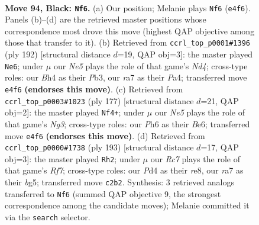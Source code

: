 \documentclass[11pt]{article}
\begin{document}
\clearpage

\begin{figure}[p]\centering
\begin{subfigure}{0.46\textwidth}\centering
\resizebox{\linewidth}{!}{%
\newchessgame
\chessboard[
  setfen={8/R7/7p/4pk2/1K1pn2b/8/2r5/8 b - - 7 94},
  showmover=false,
  pgfstyle=straightmove, color=movearrow, markmove={e4-f6}
]}
\caption{}
\end{subfigure}\hfill
\begin{subfigure}{0.46\textwidth}\centering
\resizebox{\linewidth}{!}{%
\newchessgame
\chessboard[
  setfen={2r5/8/8/p2K4/P2N4/1P6/5k2/8 w - - 1 97},
  showmover=false,
  pgfstyle=straightmove, color=movearrow, markmove={d4-e6}
]}
\caption{}
\end{subfigure}
\\[4pt]
\begin{subfigure}{0.46\textwidth}\centering
\resizebox{\linewidth}{!}{%
\newchessgame
\chessboard[
  setfen={8/R7/4b1n1/6k1/7p/8/6K1/8 b - - 29 89},
  showmover=false,
  pgfstyle=straightmove, color=movearrow, markmove={g6-f4}
]}
\caption{}
\end{subfigure}\hfill
\begin{subfigure}{0.46\textwidth}\centering
\resizebox{\linewidth}{!}{%
\newchessgame
\chessboard[
  setfen={4R3/8/2n5/2k3BP/3p4/8/5r2/3K4 b - - 0 97},
  showmover=false,
  pgfstyle=straightmove, color=movearrow, markmove={f2-h2}
]}
\caption{}
\end{subfigure}
\caption{\textbf{Move 94, Black: \texttt{Nf6}.} (a) Our position; Melanie plays \texttt{Nf6} (\texttt{e4f6}). Panels (b)--(d) are the retrieved master positions whose correspondence most drove this move (highest QAP objective among those that transfer to it). (b) Retrieved from \texttt{ccrl\_top\_p0001\#1396} (ply 192) [structural distance $d$=19, QAP obj=3]: the master played \texttt{Ne6}; under $\mu$ our \emph{Ne5} plays the role of that game's \emph{Nd4}; cross-type roles: our \emph{B}h4 as their \emph{P}b3, our \emph{r}a7 as their \emph{P}a4; transferred move \texttt{e4f6} \textbf{(endorses this move)}. (c) Retrieved from \texttt{ccrl\_top\_p0003\#1023} (ply 177) [structural distance $d$=21, QAP obj=2]: the master played \texttt{Nf4+}; under $\mu$ our \emph{Ne5} plays the role of that game's \emph{Ng3}; cross-type roles: our \emph{P}h6 as their \emph{B}e6; transferred move \texttt{e4f6} \textbf{(endorses this move)}. (d) Retrieved from \texttt{ccrl\_top\_p0000\#1738} (ply 193) [structural distance $d$=17, QAP obj=3]: the master played \texttt{Rh2}; under $\mu$ our \emph{Rc7} plays the role of that game's \emph{Rf7}; cross-type roles: our \emph{P}d4 as their \emph{r}e8, our \emph{r}a7 as their \emph{b}g5; transferred move \texttt{c2b2}. Synthesis: 3 retrieved analogs transferred to \texttt{Nf6} (summed QAP objective 9, the strongest correspondence among the candidate moves); Melanie committed it via the \texttt{search} selector.}
\label{fig:thought-m187}
\end{figure}
\end{document}

